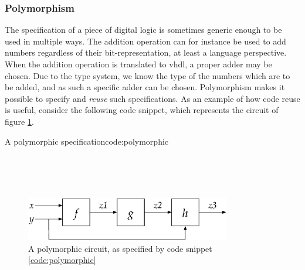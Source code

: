 \subsubsection{Polymorphism}
The specification of a piece of digital logic is sometimes generic enough to be used in multiple ways.
The addition operation can for instance be used to add numbers regardless of their bit-representation, at least a language perspective.
When the addition operation is translated to \gls{vhdl}, a proper adder may be chosen. 
Due to the type system, we know the type of the numbers which are to be added, and as such a specific adder can be chosen.
Polymorphism makes it possible to specify and \textit{reuse} such specifications.
As an example of how code reuse is useful, consider the following code snippet, which represents the circuit of figure \ref{fig:polymorphic}.

\begin{texexptitled}{A polymorphic specification}{code:polymorphic}\begin{hscode}\SaveRestoreHook
{}%
%
%
%
%
\>[3]{}\;\;\;\;\;\mathrel{=}\<[E]%
\\
\>[3]{}\<[5]%
\>[5]{}\;{}\<[13]%
\>[13]{}\mathrel{=}\;\;\<[E]%
\\
\>[13]{}\mathrel{=}\;\<[E]%
\\
\>[13]{}\mathrel{=}\;\;\<[E]%
\ColumnHook
\end{hscode}\resethooks
\end{texexptitled}

\begin{figure}[H]
\begin{center}
\centering
\includegraphics[width=0.8\textwidth]{images/polymorphic}
\end{center}
\caption{A polymorphic circuit, as specified by code snippet \ref{code:polymorphic}} \label{fig:polymorphic}
\end{figure}

